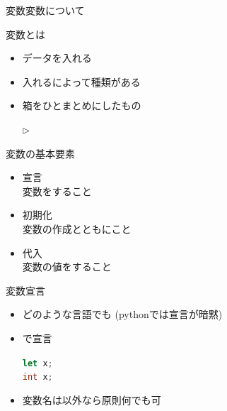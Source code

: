 \documentclass[dvipdfmx]{beamer}
\begin{document}
  \begin{frame}{変数}{変数について}
    \begin{large}変数とは\end{large}
    \begin{itemize}
      \setlength{\itemsep}{3mm}
      \item データを入れる
      \item 入れるによって種類がある
      \item 箱をひとまとめにしたもの\quad\begin{large}$\triangleright$\end{large}\quad{}
    \end{itemize}
    \vfill
    \begin{large}変数の基本要素\end{large}
    \begin{itemize}
      \setlength{\itemsep}{3mm}
      \item \alert{宣言}\\
      変数をすること
      \item \alert{初期化}\\
      変数の作成とともにこと
      \item \alert{代入}\\
      変数の値をすること
    \end{itemize}
  \end{frame}

  \begin{frame}{変数}{宣言}
    \begin{itemize}
      \setlength{\itemsep}{5mm}
      \item どのような言語でも
      (pythonでは宣言が暗黙)
      \item {}で宣言\\
      \begin{center}
        \lstinline[language=javascript]|let x;|\\
        \lstinline[language=c]|int x;|
      \end{center}
      \item 変数名は以外なら原則何でも可
    \end{itemize}
  \end{frame}
\end{document}
